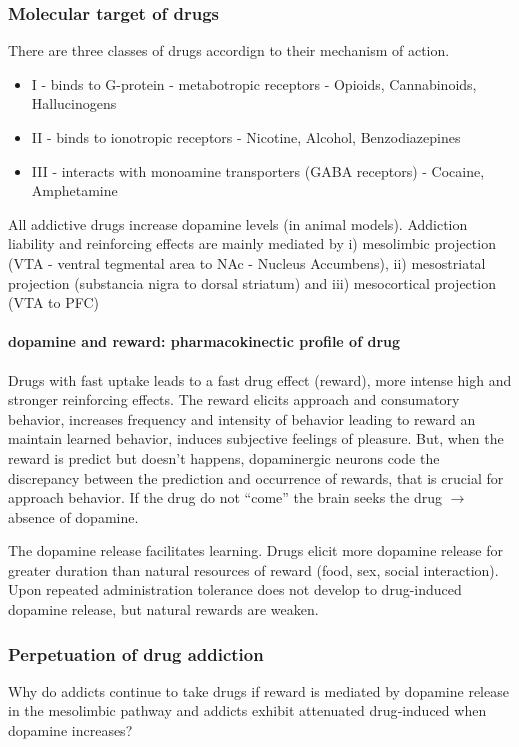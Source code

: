 \documentclass[12pt,article,oneside,a4paper]{memoir}
\begin{document}
\subsubsection{Molecular target of drugs}
There are three classes of drugs accordign to their mechanism of action.

\begin{itemize}
\item I - binds to G-protein - metabotropic receptors - Opioids, Cannabinoids, Hallucinogens
\item II - binds to ionotropic receptors - Nicotine, Alcohol, Benzodiazepines
\item III - interacts with monoamine transporters (GABA receptors) - Cocaine, Amphetamine
\end{itemize}

All addictive drugs increase dopamine levels (in animal models). Addiction liability and reinforcing effects are mainly mediated by i) mesolimbic projection (VTA - ventral tegmental area to NAc - Nucleus Accumbens), ii) mesostriatal projection (substancia nigra to dorsal striatum) and iii) mesocortical projection (VTA to PFC)

\paragraph{dopamine and reward: pharmacokinectic profile of drug}
Drugs with fast uptake leads to a fast drug effect (reward), more intense high and stronger reinforcing effects.
The reward elicits approach and consumatory behavior, increases frequency and intensity of behavior leading to reward an maintain learned behavior, induces subjective feelings of pleasure. But, when the reward is predict but doesn't happens, dopaminergic neurons code the discrepancy between the prediction and occurrence of rewards, that is crucial for approach behavior. If the drug do not ``come'' the brain seeks the drug $\rightarrow$ absence of dopamine.

The dopamine release facilitates learning. Drugs elicit more dopamine release for greater duration than natural resources of reward (food, sex, social interaction). Upon repeated administration tolerance does not develop to drug-induced dopamine release, but natural rewards are weaken.

\subsubsection{Perpetuation of drug addiction}
Why do addicts continue to take drugs if reward is mediated by dopamine release in the mesolimbic pathway and addicts exhibit attenuated drug‐induced when dopamine increases?
\end{document}

